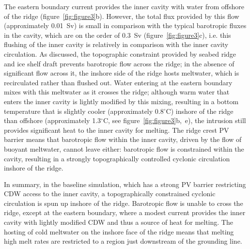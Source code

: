 \documentclass[draft]{agujournal2019}
\begin{document}
The eastern boundary current provides the inner cavity with water from offshore of the ridge (figure~\ref{fig:figure3}b). However, the total flux provided by this flow (approximately 0.01~Sv) is small in comparison with the typical barotropic fluxes in the cavity, which are on the order of 0.3~Sv  (figure~\ref{fig:figure3}c), i.e. this flushing of the inner cavity is relatively in comparison with the inner cavity circulation. As discussed, the topographic constraint provided by seabed ridge and ice shelf draft prevents barotropic flow across the ridge; in the absence of significant flow across it, the inshore side of the ridge hosts meltwater, which is recirculated rather than flushed out. Water entering at the eastern boundary mixes with this meltwater as it crosses the ridge; although warm water that enters the inner cavity is lightly modified by this mixing, resulting in a bottom temperature that is slightly cooler (approximately 0.8${}^\circ$C) inshore of the ridge than offshore (approximately 1.3${}^\circ$C, see figure~\ref{fig:figure3}b,~e), the intrusion still provides significant heat to the inner cavity for melting.  The ridge crest PV barrier means that barotropic flow within the inner cavity, driven by the flow of buoyant meltwater, cannot leave either: barotropic flow is constrained within the cavity, resulting in a strongly topographically controlled cyclonic circulation inshore of the ridge.

In summary, in the baseline simulation, which has a strong PV barrier restricting CDW access to the inner cavity, a topographically constrained cyclonic circulation is spun up inshore of the ridge. Barotropic flow is unable to cross the ridge, except at the eastern boundary, where a modest current provides the inner cavity with lightly modified CDW and thus a source of heat for melting. The hosting of cold meltwater on the inshore face of the ridge means that melting high melt rates are restricted to a region just downstream of the grounding line.
\end{document}
